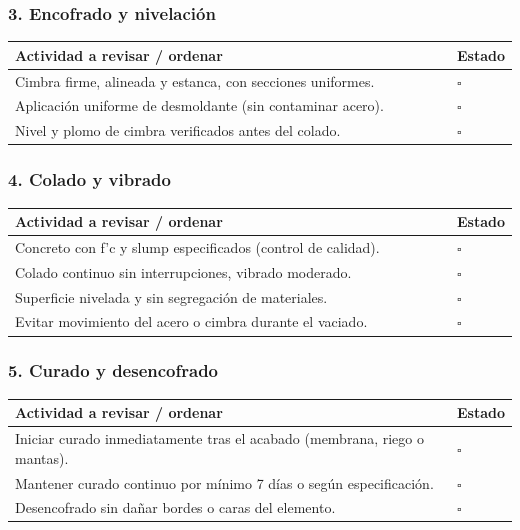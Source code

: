 \documentclass[12pt]{article}
\newcommand{\cbox}{\(\square\)}
\renewcommand{\cbox}{\(\square\)} %
\begin{document}
	\subsubsection*{3. Encofrado y nivelación}
	\begin{tabularx}{\linewidth}{>{\raggedright\arraybackslash}p{0.93\linewidth} >{\centering\arraybackslash}m{0.07\linewidth}}
		\toprule
		\textbf{Actividad a revisar / ordenar} & \textbf{Estado}\\
		\midrule
		Cimbra firme, alineada y estanca, con secciones uniformes. & \cbox \\
		Aplicación uniforme de desmoldante (sin contaminar acero). & \cbox \\
		Nivel y plomo de cimbra verificados antes del colado. & \cbox \\
		\bottomrule
	\end{tabularx}
	
	\subsubsection*{4. Colado y vibrado}
	\begin{tabularx}{\linewidth}{>{\raggedright\arraybackslash}p{0.93\linewidth} >{\centering\arraybackslash}m{0.07\linewidth}}
		\toprule
		\textbf{Actividad a revisar / ordenar} & \textbf{Estado}\\
		\midrule
		Concreto con f’c y slump especificados (control de calidad). & \cbox \\
		Colado continuo sin interrupciones, vibrado moderado. & \cbox \\
		Superficie nivelada y sin segregación de materiales. & \cbox \\
		Evitar movimiento del acero o cimbra durante el vaciado. & \cbox \\
		\bottomrule
	\end{tabularx}
	
	\subsubsection*{5. Curado y desencofrado}
	\begin{tabularx}{\linewidth}{>{\raggedright\arraybackslash}p{0.93\linewidth} >{\centering\arraybackslash}m{0.07\linewidth}}
		\toprule
		\textbf{Actividad a revisar / ordenar} & \textbf{Estado}\\
		\midrule
		Iniciar curado inmediatamente tras el acabado (membrana, riego o mantas). & \cbox \\
		Mantener curado continuo por mínimo 7 días o según especificación. & \cbox \\
		Desencofrado sin dañar bordes o caras del elemento. & \cbox \\
		\bottomrule
	\end{tabularx}
	
\end{document}
